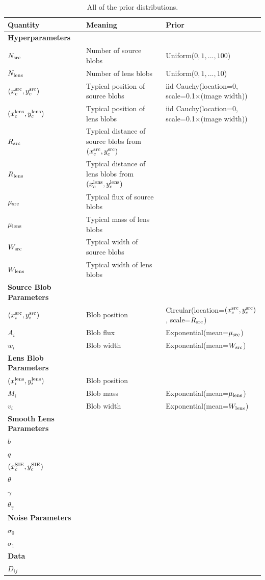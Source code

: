 \documentclass[useAMS,usenatbib]{mn2e}
\begin{document}
\begin{table}
\begin{tabular}{|l|l|l|}
\hline
Quantity	&	Meaning		& Prior\\
\hline
{\bf Hyperparameters}\\
\hline
$N_{\rm src}$	&	Number of source blobs	& Uniform($0, 1, ..., 100$)\\
$N_{\rm lens}$	&	Number of lens blobs	& Uniform($0, 1, ..., 10$)\\
$(x_c^{\rm src}, y_c^{\rm src})$ & Typical position of source blobs & iid Cauchy(location=0, scale=0.1$\times$(image width))\\
$(x_c^{\rm lens}, y_c^{\rm lens})$ & Typical position of lens blobs & iid Cauchy(location=0, scale=0.1$\times$(image width))\\
$R_{\rm src}$   &	Typical distance of source blobs from $(x_c^{\rm src}, y_c^{\rm src})$ & \\
$R_{\rm lens}$  &	Typical distance of lens blobs from $(x_c^{\rm lens}, y_c^{\rm lens})$ 	& \\
$\mu_{\rm src}$ &	Typical flux of source blobs	& \\
$\mu_{\rm lens}$&	Typical mass of lens blobs	& \\
$W_{\rm src}$ &		Typical width of source blobs	& \\
$W_{\rm lens}$&		Typical width of lens blobs	& \\
\hline
{\bf Source Blob Parameters}\\
\hline
$(x_i^{\rm src}, y_i^{\rm src})$ & Blob position & Circular(location=$(x_c^{\rm src}, y_c^{\rm src})$, scale=$R_{\rm src}$)\\
$A_i$  & Blob flux & Exponential(mean=$\mu_{\rm src}$)\\
$w_i$  & Blob width & Exponential(mean=$W_{\rm src}$)\\
\hline
{\bf Lens Blob Parameters}\\
\hline
$(x_i^{\rm lens}, y_i^{\rm lens})$ & Blob position & \\
$M_i$  & Blob mass & Exponential(mean=$\mu_{\rm lens}$)\\
$v_i$  & Blob width & Exponential(mean=$W_{\rm lens}$)\\
\hline
{\bf Smooth Lens Parameters}\\
\hline
$b$\\
$q$\\
$(x_c^{\rm SIE}, y_c^{\rm SIE})$\\
$\theta$\\
$\gamma$\\
$\theta_\gamma$\\
\hline
{\bf Noise Parameters}\\
\hline
$\sigma_0$\\
$\sigma_1$\\
\hline
{\bf Data}\\
\hline
$D_{ij}$
\end{tabular}
\caption{All of the prior distributions.
\label{tab:priors}}
\end{table}
\end{document}
